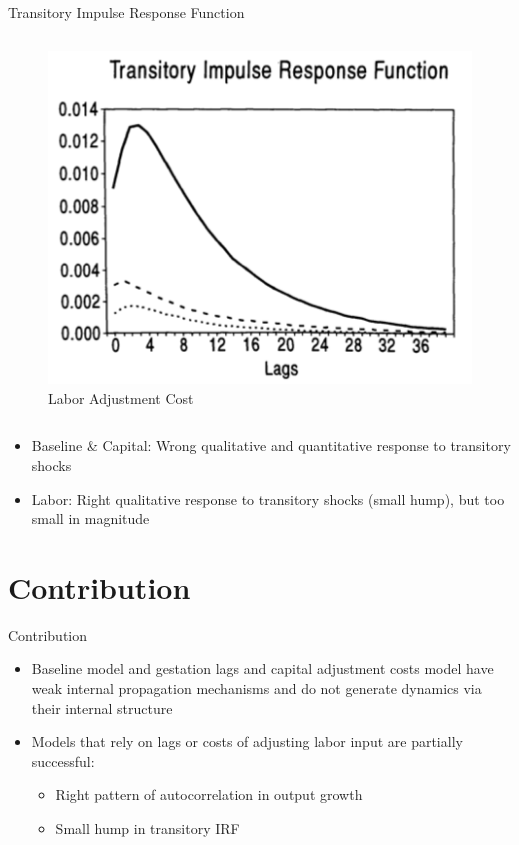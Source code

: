 \documentclass[10pt]{beamer}
\begin{document}
\begin{frame}{Transitory Impulse Response Function}
\begin{columns}[T,onlytextwidth]
        \begin{figure}
            \centering
            \includegraphics[width=\linewidth]{figures/L_trans_IRF.png}
            \caption{Labor Adjustment Cost}
        \end{figure}
    \end{columns}

    \begin{itemize}
        \item Baseline \& Capital: Wrong qualitative and quantitative response to transitory
              shocks
        \item Labor: Right qualitative response to transitory shocks (small hump), but too
              small in magnitude
    \end{itemize}

\end{frame}

\section{Contribution}

\begin{frame}{Contribution}
    \begin{itemize}
        \item Baseline model and gestation lags and capital adjustment costs model have weak
              internal propagation mechanisms and do not generate dynamics via their internal
              structure
        \item Models that rely on lags or costs of adjusting labor input are partially
              successful:
              \begin{itemize}
                  \item Right pattern of autocorrelation in output growth
                  \item Small hump in transitory IRF
              \end{itemize}
    \end{itemize}

\end{frame}
\end{document}
